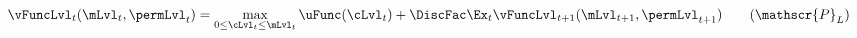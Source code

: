   \begin{align}\label{eq:levelRecProblem}
    \vFuncLvl_{t}(\mLvl_{t}, \permLvl_{t}) & = \max_{0 \leq\cLvl_{t} \leq \mLvl_{t}} \uFunc(\cLvl_{t}) + \DiscFac \Ex_{t}\vFuncLvl_{t+1}(\mLvl_{t+1}, \permLvl_{t+1}) \tag{$\mathscr{P}_{L}$}
  \end{align}
